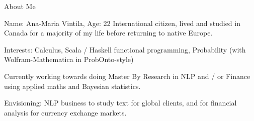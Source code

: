 


\begin{frame}{About Me}

\begin{itemizeSpaced}{10pt}
    \pinkbox Name: Ana-Maria Vintila,  Age: 22
    \pinkbox International citizen, lived and studied in Canada for a majority of my life before returning to native Europe. 
    
    \item Interests: Calculus, Scala / Haskell functional programming, Probability (with Wolfram-Mathematica in ProbOnto-style)
    
    \pinkbox Currently working towards doing Master By Research in NLP and / or Finance using applied maths and Bayesian statistics. 
    
    \pinkbox Envisioning: NLP business to study text for global clients, and for financial analysis for currency exchange markets. 
    
\end{itemizeSpaced}

    
\end{frame}